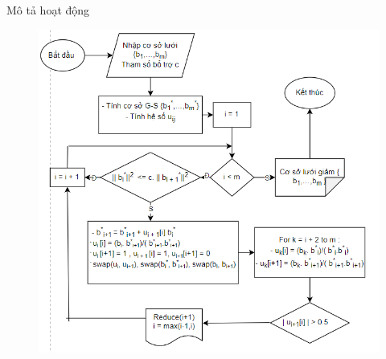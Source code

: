 \documentclass{beamer}
\numberwithin{equation}{section}
\begin{document}
\begin{frame}{Mô tả hoạt động}

\begin{figure}[h]
\centering
\includegraphics[scale = 0.6]{pictures/a.11.3.png}
\end{figure}

\end{frame}
\end{document}
